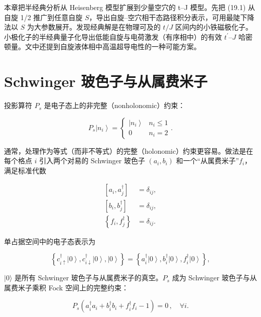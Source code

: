 本章把半经典分析从 Heisenberg 模型扩展到少量空穴的 t--J 模型。先把 (19.1) 从自旋 1/2 推广到任意自旋 $S$，导出自旋--空穴相干态路径积分表示，可用最陡下降法以 $S$ 为大参数展开。发现经典解是在物理可及的 $t/J$ 区间内的小铁磁极化子。小极化子的半经典量子化导出低能自旋与电荷激发（有序相中）的有效 $t^{\prime}$--$J$ 哈密顿量。文中还提到自旋液体相中高温超导电性的一种可能方案。

\section{Schwinger 玻色子与从属费米子}

投影算符 $P_{s}$ 是电子态上的非完整（nonholonomic）约束：

\begin{equation*}
P _ {s} \left| n _ {i} \right\rangle = \left\{ \begin{array}{ll} \left| n _ {i} \right\rangle & n _ {i} \leq 1 \\ 0 & n _ {i} = 2 \end{array} \right. .
\tag{19.3}
\end{equation*}

通常，处理作为等式（而非不等式）的完整（holonomic）约束更容易。做法是在每个格点 $i$ 引入两个对易的 Schwinger 玻色子 $(a_{i}, b_{i})$ 和一个“从属费米子”$f_{i}$，满足标准代数

\begin{align*}
\left[ a _ {i}, a _ {j} ^ {\dagger} \right] & = \delta_ {ij} ,\\
\left[ b _ {i}, b _ {j} ^ {\dagger} \right] & = \delta_ {ij} ,\\
\left\{ f _ {i}, f _ {j} ^ {\dagger} \right\} & = \delta_ {ij} .
\tag{19.4}
\end{align*}

单占据空间中的电子态表示为

\begin{equation*}
\left\{ c _ {i \uparrow} ^ {\dagger} \left| 0 \right\rangle , c _ {i \downarrow} ^ {\dagger} \left| 0 \right\rangle , \left| 0 \right\rangle \right\} = \left\{ a _ {i} ^ {\dagger} \left| 0 \right\rangle , b _ {i} ^ {\dagger} \left| 0 \right\rangle , f _ {i} ^ {\dagger} \left| 0 \right\rangle \right\} ,
\tag{19.5}
\end{equation*}

$|0\rangle$ 是所有 Schwinger 玻色子与从属费米子的真空。$P_{s}$ 成为 Schwinger 玻色子与从属费米子乘积 Fock 空间上的完整约束：

\begin{equation*}
P _ {s} \left( a _ {i} ^ {\dagger} a _ {i} + b _ {i} ^ {\dagger} b _ {i} + f _ {i} ^ {\dagger} f _ {i} - 1 \right) = 0 \, , \quad \forall i.
\tag{19.6}
\end{equation*}

